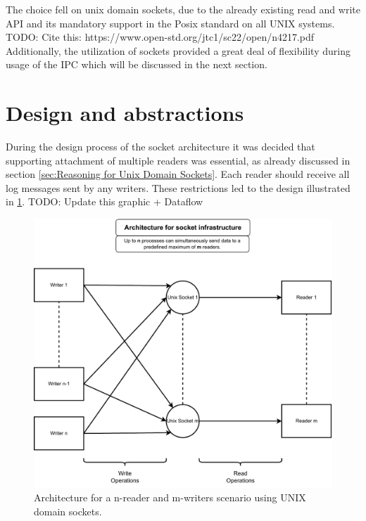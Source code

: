 The choice fell on unix domain sockets, due to the already existing read and write API and its mandatory support in the Posix standard on all UNIX systems. TODO: Cite this: https://www.open-std.org/jtc1/sc22/open/n4217.pdf
Additionally, the utilization of sockets provided a great deal of flexibility during usage of the IPC which will be discussed in the next section.

\section{Design and abstractions}
\label{sec:Design_and_abstractions}
During the design process of the socket architecture it was decided that supporting attachment of multiple readers was essential, as already discussed in section \ref{sec:Reasoning for Unix Domain Sockets}.
Each reader should receive all log messages sent by any writers.
These restrictions led to the design illustrated in \ref{fig:socket:architecture}. TODO: Update this graphic + Dataflow

\begin{figure}[h!]
    \centerline{\includegraphics[width=1.2\textwidth]{images/SocketArchitecture.pdf}}
    \caption[General design of socket architecture]{
        Architecture for a n-reader and m-writers scenario using UNIX domain sockets.}
	\label{fig:socket:architecture}
\end{figure}

